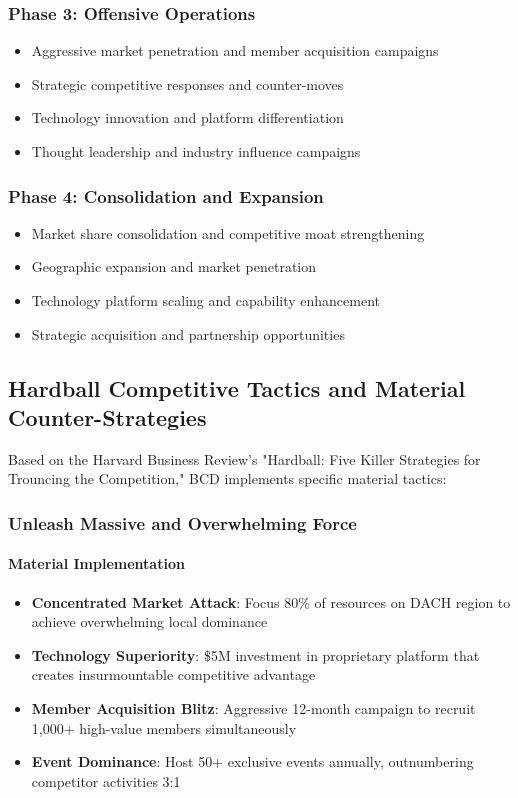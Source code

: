 \subsubsection{Phase 3: Offensive Operations}
\begin{itemize}
    \item Aggressive market penetration and member acquisition campaigns
    \item Strategic competitive responses and counter-moves
    \item Technology innovation and platform differentiation
    \item Thought leadership and industry influence campaigns
\end{itemize}

\subsubsection{Phase 4: Consolidation and Expansion}
\begin{itemize}
    \item Market share consolidation and competitive moat strengthening
    \item Geographic expansion and market penetration
    \item Technology platform scaling and capability enhancement
    \item Strategic acquisition and partnership opportunities
\end{itemize}

\subsection{Hardball Competitive Tactics and Material Counter-Strategies}

Based on the Harvard Business Review's "Hardball: Five Killer Strategies for Trouncing the Competition," BCD implements specific material tactics:

\subsubsection{Unleash Massive and Overwhelming Force}

\paragraph{Material Implementation}
\begin{itemize}
    \item \textbf{Concentrated Market Attack}: Focus 80\% of resources on DACH region to achieve overwhelming local dominance
    \item \textbf{Technology Superiority}: \$5M investment in proprietary platform that creates insurmountable competitive advantage
    \item \textbf{Member Acquisition Blitz}: Aggressive 12-month campaign to recruit 1,000+ high-value members simultaneously
    \item \textbf{Event Dominance}: Host 50+ exclusive events annually, outnumbering competitor activities 3:1
\end{itemize}


